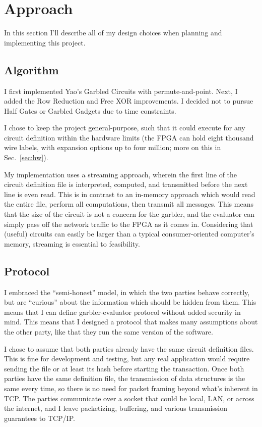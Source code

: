 \section{Approach}
In this section I'll describe all of my design choices when planning and implementing this project.

\subsection{Algorithm}
I first implemented Yao's Garbled Circuits with permute-and-point. Next, I added the Row Reduction and Free XOR improvements. I decided not to pursue Half Gates or Garbled Gadgets due to time constraints.

I chose to keep the project general-purpose, such that it could execute for any circuit definition within the hardware limits (the FPGA can hold eight thousand wire labels, with expansion options up to four million; more on this in Sec.~\ref{sec:hw}).

My implementation uses a streaming approach, wherein the first line of the circuit definition file is interpreted, computed, and transmitted before the next line is even read. This is in contrast to an in-memory approach which would read the entire file, perform all computations, then transmit all messages. This means that the size of the circuit is not a concern for the garbler, and the evaluator can simply pass off the network traffic to the FPGA as it comes in. Considering that (useful) circuits can easily be larger than a typical consumer-oriented computer's memory, streaming is essential to feasibility.

\subsection{Protocol}
I embraced the ``semi-honest'' model, in which the two parties behave correctly, but are ``curious'' about the information which should be hidden from them. This means that I can define garbler-evaluator protocol without added security in mind. This means that I designed a protocol that makes many assumptions about the other party, like that they run the same version of the software.

I chose to assume that both parties already have the same circuit definition files. This is fine for development and testing, but any real application would require sending the file or at least its hash before starting the transaction. Once both parties have the same definition file, the transmission of data structures is the same every time, so there is no need for packet framing beyond what's inherent in TCP. The parties communicate over a socket that could be local, LAN, or across the internet, and I leave packetizing, buffering, and various transmission guarantees to TCP/IP.

